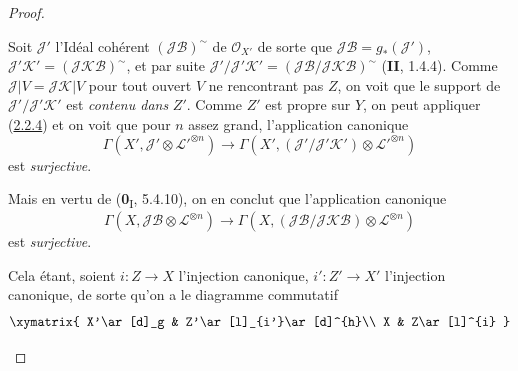 \begin{proof}
\begin{env}[2.6.2.5]
Soit $\mathcal J'$ l'Idéal cohérent $(\mathcal J\mathcal B)^\sim$ de
$\mathcal O_{X'}$ de sorte que $\mathcal J\mathcal B=g_*(\mathcal J')$,
$\mathcal J'\mathcal K'=(\mathcal J\mathcal K\mathcal B)^\sim$, et par
suite
$\mathcal J'/\mathcal J'\mathcal K'
=(\mathcal J\mathcal B/\mathcal J\mathcal K\mathcal B)^\sim$
(\textbf{II}, 1.4.4). Comme $\mathcal J|V=\mathcal J\mathcal K|V$ pour tout
ouvert $V$ ne rencontrant pas $Z$, on voit que le support de
$\mathcal J'/\mathcal J'\mathcal K'$ est \emph{contenu dans} $Z'$. Comme $Z'$ est
propre sur $Y$, on peut appliquer (\hyperref[III.2.2.4-fr]{2.2.4}) et on
voit que pour $n$ assez grand, l'application canonique
\[
\Gamma(X',\mathcal J'\otimes\mathcal L'^{\otimes n})
\longrightarrow
\Gamma(X',(\mathcal J'/\mathcal J'\mathcal K')
\otimes\mathcal L'^{\otimes n})
\]
est \emph{surjective}.

Mais en vertu de (\textbf{0}\textsubscript{I}, 5.4.10), on en
conclut que l'application canonique
\[
\Gamma(X,\mathcal J\mathcal B\otimes\mathcal L^{\otimes n})
\longrightarrow
\Gamma(X,(\mathcal J\mathcal B/\mathcal J\mathcal K\mathcal B)
\otimes\mathcal L^{\otimes n})
\]
est \emph{surjective}.

Cela étant, soient $i:Z\to X$ l'injection canonique,
$i':Z'\to X'$ l'injection canonique, de sorte qu'on a le diagramme
commutatif
\[
\xymatrix{
X'\ar[d]_g & Z'\ar[l]_{i'}\ar[d]^{h}\\
X & Z\ar[l]^{i}
}
\]


\end{env}
\end{proof}
